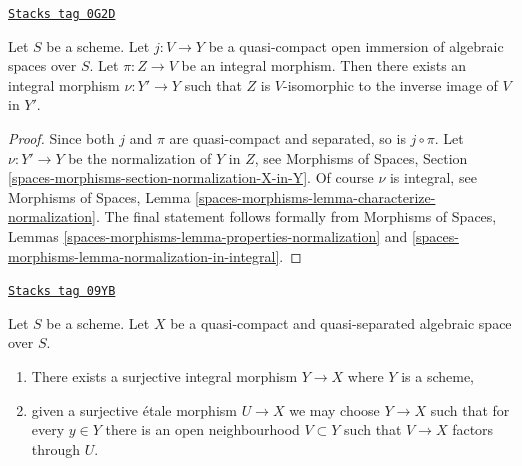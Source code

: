\begin{lemma}
\label{decent-spaces-lemma-extend-integral-morphism}
\href{https://stacks.math.columbia.edu/tag/0G2D}{\texttt{Stacks tag 0G2D}}

Let $S$ be a scheme. Let $j : V \to Y$ be a quasi-compact open immersion
of algebraic spaces over $S$. Let $\pi : Z \to V$ be an integral morphism.
Then there exists an integral morphism $\nu : Y' \to Y$ such that
$Z$ is $V$-isomorphic to the inverse image of $V$ in $Y'$.
\end{lemma}

\begin{proof}
Since both $j$ and $\pi$ are quasi-compact and separated, so is
$j \circ \pi$. Let $\nu : Y' \to Y$ be the normalization of $Y$ in $Z$, see
Morphisms of Spaces, Section
\ref{spaces-morphisms-section-normalization-X-in-Y}.
Of course $\nu$ is integral, see
Morphisms of Spaces, Lemma
\ref{spaces-morphisms-lemma-characterize-normalization}.
The final statement follows formally from
Morphisms of Spaces, Lemmas
\ref{spaces-morphisms-lemma-properties-normalization} and
\ref{spaces-morphisms-lemma-normalization-in-integral}.
\end{proof}

\begin{lemma}
\label{decent-spaces-lemma-there-is-a-scheme-integral-over}
\href{https://stacks.math.columbia.edu/tag/09YB}{\texttt{Stacks tag 09YB}}

Let $S$ be a scheme. Let $X$ be a quasi-compact and quasi-separated
algebraic space over $S$.
\begin{enumerate}
\item There exists a surjective integral morphism $Y \to X$ where $Y$
is a scheme,
\item given a surjective \'etale morphism $U \to X$ we may choose
$Y \to X$ such that for every $y \in Y$ there is an open neighbourhood
$V \subset Y$ such that $V \to X$ factors through $U$.
\end{enumerate}
\end{lemma}

